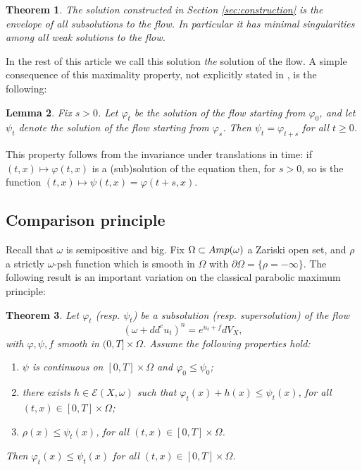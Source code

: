 \documentclass[10pt,a4paper]{amsart}
\numberwithin{equation}{section}
\newtheorem{theorem}{Theorem}[section]
\newtheorem{lem}[theorem]{Lemma}
\newcommand{\f}{\varphi}
\newcommand{\p}{\psi}
\begin{document}
\begin{theorem} \label{thm:maxflow}
The solution 
 constructed in Section \ref{sec:construction} is the envelope of
all subsolutions to the flow. In particular it has minimal singularities among all
weak solutions to the flow.
\end{theorem}

In the rest of this article we call this solution {\it the} solution of the flow.
A simple consequence of this maximality property, 
not explicitly stated in \cite{GZ17,DNL17}, is the following:

\begin{lem} \label{lem:semigroup}
Fix $s>0$.
Let $\f_t$ be the solution of the flow starting from $\f_0$,
and let $\p_t$ denote the solution of the flow starting from  $\f_s$.
Then $\p_t=\f_{t+s}$ for all $t \geq 0$.
\end{lem}


This property  follows from  the invariance under translations in time: 
if $(t,x) \mapsto \f(t,x)$ is a (sub)solution of the equation then, 
 for $s > 0$, so is the function $(t,x) \mapsto \p(t,x) = \f(t + s,x)$.








\subsection{Comparison principle}
Recall that $\omega$ is semipositive and big. 
Fix $\Omega \subset {\rm Amp}(\omega)$ a Zariski open set,
and $\rho$ a strictly $\omega$-psh  function which is smooth in $\Omega$
 with $\partial \Omega = \{\rho=-\infty\}$.
The following result is an important variation on the classical parabolic maximum principle: 



\begin{theorem}\label{thm:pcp}
Let $\varphi_t$ (resp. $\psi_t$) be a subsolution (resp. supersolution) of the flow 
\[
(\omega+dd^c u_t)^n =e^{\dot{u}_t +f} dV_X, 
\]
 with 
$\varphi,\psi,f$ smooth in $(0,T] \times  \Omega$. 
Assume the following properties hold:
\begin{enumerate}
\item $\psi$ is continuous on $[0,T]\times \Omega$ and $\varphi_0\leq \psi_0$;
\item there exists $h\in \mathcal{E}(X,\omega)$ such that $\varphi_t(x)+h(x)\leq \psi_t(x)$, 
for all $(t,x) \in [0,T] \times \Omega$;
\item $\rho(x) \leq \psi_t(x)$, for all $(t,x) \in [0,T] \times \Omega$.
\end{enumerate}
Then $\f_t(x) \leq \p_t(x)$ for all $(t,x) \in [0,T] \times \Omega$.
\end{theorem}
\end{document}

